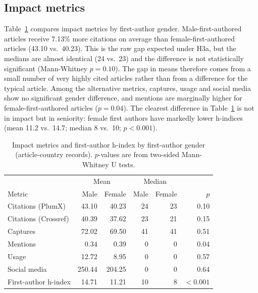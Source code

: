 \documentclass[preprint,12pt,number]{elsarticle}
\begin{document}
\subsection{Impact metrics}\label{sec:impact}

Table~\ref{tab:metrics} compares impact metrics by first-author gender. Male-first-authored articles receive 7.13\% more citations on average than female-first-authored articles (43.10 vs.\ 40.23). This is the raw gap expected under H3a, but the medians are almost identical (24 vs.\ 23) and the difference is not statistically significant (Mann-Whitney $p=0.10$). The gap in means therefore comes from a small number of very highly cited articles rather than from a difference for the typical article. Among the alternative metrics, captures, usage and social media show no significant gender difference, and mentions are marginally higher for female-first-authored articles ($p=0.04$). The clearest difference in Table~\ref{tab:metrics} is not in impact but in seniority: female first authors have markedly lower h-indices (mean 11.2 vs.\ 14.7; median 8 vs.\ 10; $p<0.001$).

\begin{table}[htbp]
\centering
\caption{Impact metrics and first-author h-index by first-author gender (article-country records). $p$-values are from two-sided Mann-Whitney U tests.}
\label{tab:metrics}
\begin{tabular}{lrrrrr}
\toprule
 & \multicolumn{2}{c}{Mean} & \multicolumn{2}{c}{Median} & \\
Metric & Male & Female & Male & Female & $p$ \\
\midrule
Citations (PlumX)    & 43.10 & 40.23 & 24 & 23 & 0.10 \\
Citations (Crossref) & 40.39 & 37.62 & 23 & 21 & 0.15 \\
Captures             & 72.02 & 69.50 & 41 & 41 & 0.51 \\
Mentions             & 0.34 & 0.39 & 0 & 0 & 0.04 \\
Usage                & 12.72 & 8.95 & 0 & 0 & 0.57 \\
Social media         & 250.44 & 204.25 & 0 & 0 & 0.64 \\
\midrule
First-author h-index & 14.71 & 11.21 & 10 & 8 & $<0.001$ \\
\bottomrule
\end{tabular}
\end{table}
\end{document}

